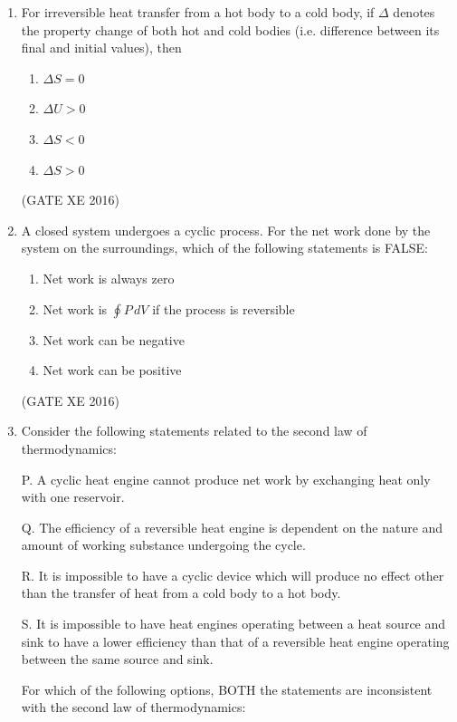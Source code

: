 \documentclass[12pt]{article}
\begin{document}
\begin{enumerate}
(GATE XE 2016)

\item For irreversible heat transfer from a hot body to a cold body, if $\Delta$ denotes the property change of both hot and cold bodies (i.e. difference between its final and initial values), then

\begin{multicols}{2}
\begin{enumerate}
\item $\Delta S = 0$
\item $\Delta U > 0$
\item $\Delta S < 0$
\item $\Delta S > 0$
\end{enumerate}
\end{multicols}

(GATE XE 2016)

\item A closed system undergoes a cyclic process. For the net work done by the system on the surroundings, which of the following statements is FALSE:

\begin{enumerate}
\item Net work is always zero
\item Net work is $\oint P \, dV$ if the process is reversible
\item Net work can be negative
\item Net work can be positive
\end{enumerate}

(GATE XE 2016)

\item Consider the following statements related to the second law of thermodynamics:

P. A cyclic heat engine cannot produce net work by exchanging heat only with one reservoir.  

Q. The efficiency of a reversible heat engine is dependent on the nature and amount of working substance undergoing the cycle. 

R. It is impossible to have a cyclic device which will produce no effect other than the transfer of heat from a cold body to a hot body.  

S. It is impossible to have heat engines operating between a heat source and sink to have a lower efficiency than that of a reversible heat engine operating between the same source and sink.  

For which of the following options, BOTH the statements are inconsistent with the second law of thermodynamics:


\end{enumerate}
\end{document}
